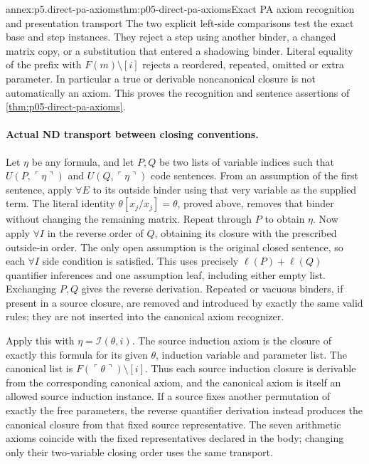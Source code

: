\begin{annexitem}{annex:p5.direct-pa-axioms}{thm:p05-direct-pa-axioms}{Exact PA axiom recognition and presentation transport}
The two explicit left-side comparisons test the exact base and step
instances.  They reject a step using another binder, a changed matrix
copy, or a substitution that entered a shadowing binder.  Literal equality
of the prefix with \(F(m)\setminus[i]\) rejects a reordered, repeated,
omitted or extra parameter.  In particular a true or derivable noncanonical
closure is not automatically an axiom.  This proves the recognition and
sentence assertions of \cref{thm:p05-direct-pa-axioms}.

\paragraph{Actual ND transport between closing conventions.}
Let \(\eta\) be any formula, and let \(P,Q\) be two lists of variable
indices such that \(U(P,\ulcorner\eta\urcorner)\) and
\(U(Q,\ulcorner\eta\urcorner)\) code sentences.  From an assumption
of the first sentence, apply \(\forall E\) to its outside binder using
that very variable as the supplied term.  The literal identity
\(\theta[x_j/x_j]=\theta\), proved above, removes that binder without
changing the remaining matrix.  Repeat through \(P\) to obtain \(\eta\).
Now apply \(\forall I\) in the reverse order of \(Q\), obtaining its
closure with the prescribed outside-in order.  The only open assumption
is the original closed sentence, so each \(\forall I\) side condition
is satisfied.  This uses precisely \(\ell(P)+\ell(Q)\) quantifier
inferences and one assumption leaf, including either empty list.
Exchanging \(P,Q\) gives the reverse derivation.  Repeated or vacuous
binders, if present in a source closure, are removed and introduced by
exactly the same valid rules; they are not inserted into the canonical
axiom recognizer.

Apply this with \(\eta=\mathcal I(\theta,i)\).  The source induction
axiom is the closure of exactly this formula for its given \(\theta\),
induction variable and parameter list.  The canonical list is
\(F(\ulcorner\theta\urcorner)\setminus[i]\).  Thus each source
induction closure is derivable from the corresponding canonical axiom,
and the canonical axiom is itself an allowed source induction instance.
If a source fixes another permutation of exactly the free parameters,
the reverse quantifier derivation instead produces the canonical closure
from that fixed source representative.  The seven arithmetic axioms coincide
with the fixed representatives declared in the body; changing only their
two-variable closing order uses the same transport.


\end{annexitem}
